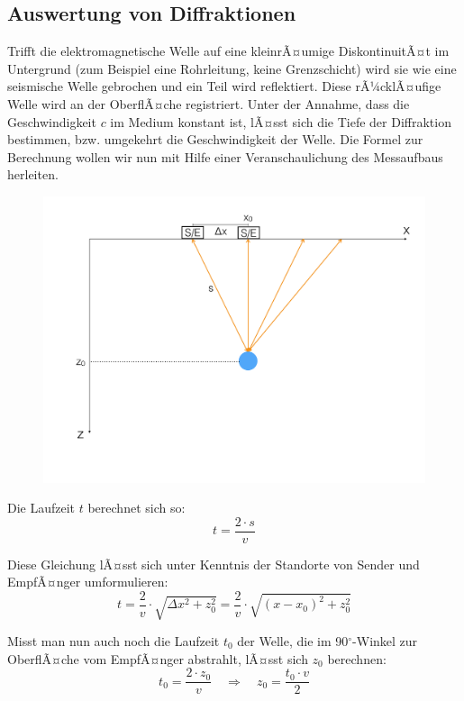 \subsection{Auswertung von Diffraktionen}
Trifft die elektromagnetische Welle auf eine kleinrÃ¤umige DiskontinuitÃ¤t im Untergrund (zum Beispiel eine Rohrleitung, keine Grenzschicht) wird sie wie eine seismische Welle gebrochen und ein Teil wird reflektiert. Diese rÃ¼cklÃ¤ufige Welle wird an der OberflÃ¤che registriert. Unter der Annahme, dass die Geschwindigkeit $c$ im Medium konstant ist, lÃ¤sst sich die Tiefe der Diffraktion bestimmen, bzw. umgekehrt die Geschwindigkeit der Welle. Die Formel zur Berechnung wollen wir nun mit Hilfe einer Veranschaulichung des Messaufbaus herleiten.


\begin{figure}[H]
	\centering
	\includegraphics[width = \textwidth]{GeoradarBilder/DiffraktionAufbau}
\end{figure}


Die Laufzeit $t$ berechnet sich so: \begin{equation*}
	t = \frac{2 \cdot s}{v}
\end{equation*}

Diese Gleichung lÃ¤sst sich unter Kenntnis der Standorte von Sender und EmpfÃ¤nger umformulieren: \begin{equation*}
	t = \frac{2}{v} \cdot \sqrt{\Delta x^2 + z_0^2} = \frac{2}{v} \cdot \sqrt{(x-x_0)^2 + z_0^2}
\end{equation*}

Misst man nun auch noch die Laufzeit $t_0$ der Welle, die im 90$^\circ$-Winkel zur OberflÃ¤che vom EmpfÃ¤nger abstrahlt, lÃ¤sst sich $z_0$ berechnen: \begin{equation*}
	t_0 = \frac{2 \cdot z_0}{v} \quad \Rightarrow \quad z_0 = \frac{t_0 \cdot v}{2}
\end{equation*}

